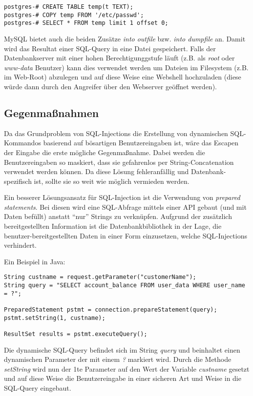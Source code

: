 \begin{verbatim}
postgres-# CREATE TABLE temp(t TEXT);
postgres-# COPY temp FROM '/etc/passwd';
postgres-# SELECT * FROM temp limit 1 offset 0;
\end{verbatim}

MySQL bietet auch die beiden Zusätze \textit{into outfile} bzw. \textit{into dumpfile} an. Damit wird das Resultat einer SQL-Query in eine Datei gespeichert. Falls der Datenbankserver mit einer hohen Berechtigunggstufe läuft (z.B. als \textit{root} oder \textit{www-data} Benutzer) kann dies verwendet werden um Dateien im Filesystem (z.B. im Web-Root) abzulegen und auf diese Weise eine Webshell hochzuladen (diese würde dann durch den Angreifer über den Webserver geöffnet werden).

\subsection{Gegenmaßnahmen}

Da das Grundproblem von SQL-Injections die Erstellung von dynamischen SQL-Kommandos basierend auf bösartigen Benutzereingaben ist, wäre das Escapen der Eingabe die erste mögliche Gegenmaßnahme. Dabei werden die Benutzereingaben so maskiert, dass sie gefahrenlos per String-Concatenation verwendet werden können. Da diese Lösung fehleranfällig und Datenbank-spezifisch ist, sollte sie so weit wie möglich vermieden werden.

Ein besserer Lösungsansatz für SQL-Injection ist die Verwendung von \textit{prepared statements}. Bei diesen wird eine SQL-Abfrage mittels einer API gebaut (und mit Daten befüllt) anstatt ``nur'' Strings zu verknüpfen. Aufgrund der zusätzlich bereitgestellten Information ist die Datenbankbibliothek in der Lage, die benutzer-bereitgestellten Daten in einer Form einzusetzen, welche SQL-Injections verhindert.

Ein Beispiel in Java:

\begin{verbatim}
String custname = request.getParameter("customerName");
String query = "SELECT account_balance FROM user_data WHERE user_name = ?";

PreparedStatement pstmt = connection.prepareStatement(query);
pstmt.setString(1, custname);

ResultSet results = pstmt.executeQuery();
\end{verbatim}

Die dynamische SQL-Query befindet sich im String \textit{query} und beinhaltet einen dynamischen Parameter der mit einem \textit{?} markiert wird. Durch die Methode \textit{setString} wird nun der 1te Parameter auf den Wert der Variable \textit{custname} gesetzt und auf diese Weise die Benutzereingabe in einer sicheren Art und Weise in die SQL-Query eingebaut.

